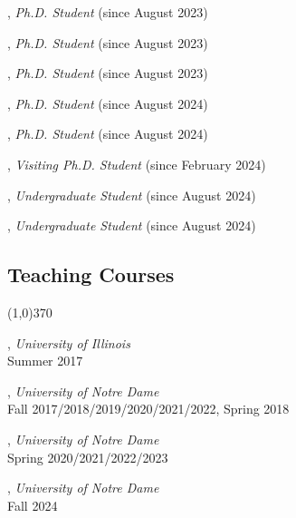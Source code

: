 \documentclass[10pt]{article}
\newenvironment{myindentpar}[1]%
{\begin{list}{}%
         {\setlength{\leftmargin}{#1}}%
         \item[]%
}
{\end{list}}
\newcounter{list}
\begin{document}
\begin{myindentpar}{0.75cm}
\hspace{-0.75cm}{\bf Ms. Mengzhao Jia}, \textit{Ph.D. Student} (since August 2023)

\hspace{-0.75cm}{\bf Zheyuan (Frank) Liu}, \textit{Ph.D. Student} (since August 2023)

\hspace{-0.75cm}{\bf Zhaoxuan Tan}, \textit{Ph.D. Student} (since August 2023)

\hspace{-0.75cm}{\bf Yining Lu}, \textit{Ph.D. Student} (since August 2024)

\hspace{-0.75cm}{\bf Ms. Yihan Zhu}, \textit{Ph.D. Student} (since August 2024)

\hspace{-0.75cm}{\bf Zhenyu Wu}, \textit{Visiting Ph.D. Student} (since February 2024)

\hspace{-0.75cm}{\bf Ms. Olivia Zino}, \textit{Undergraduate Student} (since August 2024)

\hspace{-0.75cm}{\bf Lang Li}, \textit{Undergraduate Student} (since August 2024)

\end{myindentpar}

\subsection{\sc Teaching Courses}
\vspace{-0.4cm} \line(1,0){370} \vspace{-0.1cm}

\begin{myindentpar}{0.75cm}

\hspace{-0.75cm}{\bf CS 412 Introduction to Data Mining}, \textit{University of Illinois} \\
	Summer 2017
	
\hspace{-0.75cm}{\bf CSE 40647/60647 Data Science}, \textit{University of Notre Dame}  \\
	Fall 2017/2018/2019/2020/2021/2022, Spring 2018

\hspace{-0.75cm}{\bf CSE 60326 Computational Behavior Modeling}, \textit{University of Notre Dame} \\
	Spring 2020/2021/2022/2023

\hspace{-0.75cm}{\bf CSE 60556 Large Language Models}, \textit{University of Notre Dame} \\
	Fall 2024

\end{myindentpar}
\end{document}
